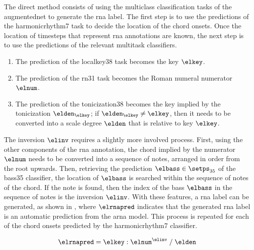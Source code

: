 

The direct method consists of using the multiclass
classification tasks of the \gls{augmentednet} to generate
the \gls{rna} label. The first step is to use the
predictions of the \gls{harmonicrhythm7} task to decide the
location of the chord onsets. Once the location of timesteps
that represent \gls{rna} annotations are known, the next
step is to use the predictions of the relevant multitask
classifiers.

\begin{enumerate}
    \item[] The prediction of the \gls{localkey38} task
    becomes the key $\elkey$.
    \item[] The prediction of the \gls{rn31} task becomes
    the Roman numeral numerator $\elnum$.
    \item[] The prediction of the \gls{tonicization38}
    becomes the key implied by the tonicization
    $\elden_\elkey$; if $\elden_\elkey \neq \elkey$, then it
    needs to be converted into a scale degree $\elden$ that
    is relative to key $\elkey$.
\end{enumerate}

The inversion $\elinv$ requires a slightly more involved
process. First, using the other components of the \gls{rna}
annotation, the chord implied by the numerator $\elnum$
needs to be converted into a sequence of notes, arranged in
order from the root upwards. Then, retrieving the prediction
$\elbass \in \setps_{35}$ of the \gls{bass35} classifier,
the location of $\elbass$ is searched within the sequence of
notes of the chord. If the note is found, then the index of
the bass $\elbass$ in the sequence of notes is the inversion
$\elinv$. With these features, a \gls{rna} label can be
generated, as shown in , where
$\elrnapred$ indicates that the generated \gls{rna} label is
an automatic prediction from the \gls{arna} model. This
process is repeated for each of the chord onsets predicted
by the \gls{harmonicrhythm7} classifier.

\begin{equation}
    \label{eq:rna_direct}
    \elrnapred = \elkey : \elnum^{\elinv} \; / \; \elden
\end{equation}



